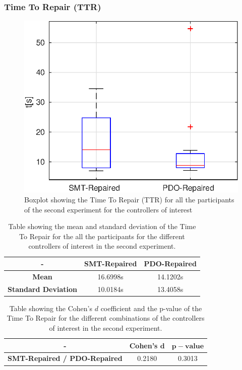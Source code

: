 \subsubsection{Time To Repair (TTR)}\label{subsub:second-TTR}
\begin{figure}[H]
    \centering
    \includegraphics[width=\textwidth]{Images/second-experiment/exp1_time_to_repair.eps}
    \caption{Boxplot showing the Time To Repair (TTR) for all the participants of the second experiment for the controllers of interest}
    \label{fig:box-TTR-second}
\end{figure}
\begin{table}[H]
    \centering
    \begin{tabular}{|c|c|c|}
        \hline
        - & \textbf{SMT-Repaired} & \textbf{PDO-Repaired} \\
        \hline
        \textbf{Mean} & 16.6998s & 14.1202s \\
        \textbf{Standard Deviation} & 10.0184s & 13.4058s \\
        \hline
    \end{tabular}
    \caption{Table showing the mean and standard deviation of the Time To Repair for the all the participants for the different controllers of interest in the second experiment.}
    \label{tab:TTR-second-mean-std}
\end{table}
\begin{table}[H]
    \centering
    \begin{tabular}{|c|c|c|}
        \hline
        - & \textbf{Cohen's} $\mathbf{d}$ & $\mathbf{p-value}$ \\
        \hline
        \textbf{SMT-Repaired / PDO-Repaired} & 0.2180 & 0.3013 \\
        \hline
    \end{tabular}
    \caption{Table showing the Cohen's $d$ coefficient and the p-value of the Time To Repair for the different combinations of the controllers of interest in the second experiment.}
    \label{tab:TTR-second-cohen-p}
\end{table}